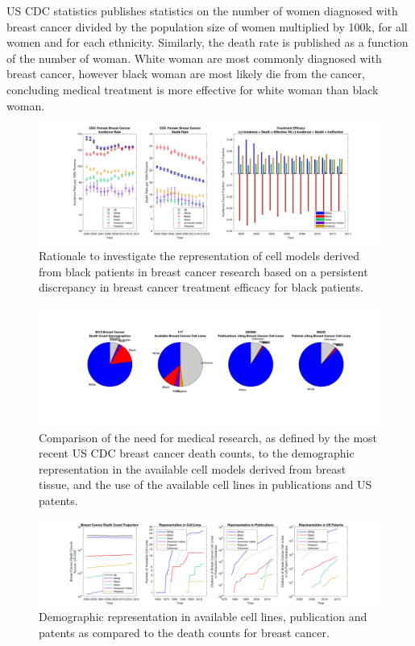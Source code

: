 \documentclass[11pt]{article}
\begin{document}
US CDC statistics publishes statistics on the number of women diagnosed with breast cancer divided by the population size of women multiplied by 100k, for all women and for each ethnicity. Similarly, the death rate is published as a function of the number of woman. White woman are most commonly diagnosed with breast cancer, however black woman are most likely die from the cancer, concluding medical treatment is more effective for white woman than black woman. 

\begin{figure}[h!]
\centering
\includegraphics[width=1\columnwidth, trim = {40cm 0cm 30cm 0cm}, clip]{Rationale.jpg}
\caption{\label{PS} Rationale to investigate the representation of cell models derived from black patients in breast cancer research based on a persistent discrepancy in breast cancer treatment efficacy for black patients. }
\end{figure}

\begin{figure}[h!]
\centering
\includegraphics[width=1\columnwidth, trim = {40cm 20cm 30cm 20cm}, clip]{CellLines.jpg}
\caption{\label{PS} Comparison of the need for medical research, as defined by the most recent US CDC breast cancer death counts, to the demographic representation in the available cell models derived from breast tissue, and the use of the available cell lines in publications and US patents.}
\end{figure}

\begin{figure}[h!]
\centering
\includegraphics[width=1\columnwidth, trim = {10cm 0cm 10cm 0cm}, clip]{Trajectory.jpg}
\caption{\label{PS} Demographic representation in available cell lines, publication and patents as compared to the death counts for breast cancer.}
\end{figure}
\end{document}
